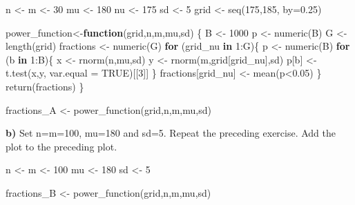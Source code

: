\documentclass[
]{article}
\newenvironment{Shaded}{\begin{snugshade}}{\end{snugshade}}
\newcommand{\AttributeTok}[1]{\textcolor[rgb]{0.77,0.63,0.00}{#1}}
\newcommand{\ConstantTok}[1]{\textcolor[rgb]{0.00,0.00,0.00}{#1}}
\newcommand{\ControlFlowTok}[1]{\textcolor[rgb]{0.13,0.29,0.53}{\textbf{#1}}}
\newcommand{\DecValTok}[1]{\textcolor[rgb]{0.00,0.00,0.81}{#1}}
\newcommand{\FloatTok}[1]{\textcolor[rgb]{0.00,0.00,0.81}{#1}}
\newcommand{\FunctionTok}[1]{\textcolor[rgb]{0.00,0.00,0.00}{#1}}
\newcommand{\NormalTok}[1]{#1}
\newcommand{\OtherTok}[1]{\textcolor[rgb]{0.56,0.35,0.01}{#1}}
\newcommand{\SpecialCharTok}[1]{\textcolor[rgb]{0.00,0.00,0.00}{#1}}
\begin{document}
\begin{Shaded}
\begin{Highlighting}[]
\NormalTok{n }\OtherTok{\textless{}{-}}\NormalTok{ m }\OtherTok{\textless{}{-}} \DecValTok{30}
\NormalTok{mu }\OtherTok{\textless{}{-}} \DecValTok{180}
\NormalTok{nu }\OtherTok{\textless{}{-}} \DecValTok{175}
\NormalTok{sd }\OtherTok{\textless{}{-}} \DecValTok{5}
\NormalTok{grid }\OtherTok{\textless{}{-}} \FunctionTok{seq}\NormalTok{(}\DecValTok{175}\NormalTok{,}\DecValTok{185}\NormalTok{, }\AttributeTok{by=}\FloatTok{0.25}\NormalTok{)}

\NormalTok{power\_function}\OtherTok{\textless{}{-}}\ControlFlowTok{function}\NormalTok{(grid,n,m,mu,sd) \{}
\NormalTok{  B }\OtherTok{\textless{}{-}} \DecValTok{1000}
\NormalTok{  p }\OtherTok{\textless{}{-}} \FunctionTok{numeric}\NormalTok{(B)}
\NormalTok{  G }\OtherTok{\textless{}{-}} \FunctionTok{length}\NormalTok{(grid)}
\NormalTok{  fractions }\OtherTok{\textless{}{-}} \FunctionTok{numeric}\NormalTok{(G)}
  \ControlFlowTok{for}\NormalTok{ (grid\_nu }\ControlFlowTok{in} \DecValTok{1}\SpecialCharTok{:}\NormalTok{G)\{}
\NormalTok{    p }\OtherTok{\textless{}{-}} \FunctionTok{numeric}\NormalTok{(B)}
    \ControlFlowTok{for}\NormalTok{ (b }\ControlFlowTok{in} \DecValTok{1}\SpecialCharTok{:}\NormalTok{B)\{}
\NormalTok{      x }\OtherTok{\textless{}{-}} \FunctionTok{rnorm}\NormalTok{(n,mu,sd)}
\NormalTok{      y }\OtherTok{\textless{}{-}} \FunctionTok{rnorm}\NormalTok{(m,grid[grid\_nu],sd)}
\NormalTok{      p[b] }\OtherTok{\textless{}{-}} \FunctionTok{t.test}\NormalTok{(x,y, }\AttributeTok{var.equal =} \ConstantTok{TRUE}\NormalTok{)[[}\DecValTok{3}\NormalTok{]]}
\NormalTok{    \}}
\NormalTok{    fractions[grid\_nu] }\OtherTok{\textless{}{-}} \FunctionTok{mean}\NormalTok{(p}\SpecialCharTok{\textless{}}\FloatTok{0.05}\NormalTok{)}
\NormalTok{  \}}
  \FunctionTok{return}\NormalTok{(fractions)}
\NormalTok{\}}

\NormalTok{fractions\_A }\OtherTok{\textless{}{-}} \FunctionTok{power\_function}\NormalTok{(grid,n,m,mu,sd)}
\end{Highlighting}
\end{Shaded}

\textbf{b)} Set n=m=100, mu=180 and sd=5. Repeat the preceding exercise.
Add the plot to the preceding plot.

\begin{Shaded}
\begin{Highlighting}[]
\NormalTok{n }\OtherTok{\textless{}{-}}\NormalTok{ m }\OtherTok{\textless{}{-}} \DecValTok{100}
\NormalTok{mu }\OtherTok{\textless{}{-}} \DecValTok{180}
\NormalTok{sd }\OtherTok{\textless{}{-}} \DecValTok{5}

\NormalTok{fractions\_B }\OtherTok{\textless{}{-}} \FunctionTok{power\_function}\NormalTok{(grid,n,m,mu,sd)}
\end{Highlighting}
\end{Shaded}
\end{document}

